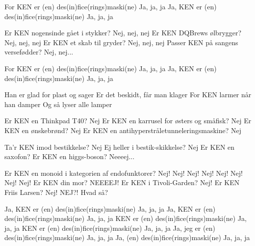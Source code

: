 \documentclass[a4paper,11pt]{article}
\begin{document}
\begin{song}
 For KEN er (en) des(in)fice(rings)maski(ne)
 Ja, ja, ja 
 Ja, KEN er (en) des(in)fice(rings)maski(ne)
 Ja, ja, ja

 Er KEN nogensinde gået i stykker?
 Nej, nej, nej
 Er KEN DQBrews ølbrygger?
 Nej, nej, nej
 Er KEN et skab til gryder?
 Nej, nej, nej
 Passer KEN på sangens versefødder?
 Nej, nej...

 For KEN er (en) des(in)fice(rings)maski(ne) 
 Ja, ja, ja 
 Ja, KEN er (en) des(in)fice(rings)maski(ne) 
 Ja, ja, ja

 Han er glad for plast og sager
Er det beskidt, får man klager
For KEN larmer når han damper
Og så lyser alle lamper



 Er KEN en Thinkpad T40?
 Nej
 Er KEN en karrusel for østers og småfisk?
 Nej
 Er KEN en ønskebrønd?
 Nej
 Er KEN en antihyperstråletunneleringsmaskine?
 Nej


 Ta'r KEN imod bestikkelse?
 Nej
 Ej heller i bestik-skikkelse?
 Nej
 Er KEN en saxofon?
 Er KEN en higgs-boson?
 Neeeej...


 Er KEN en monoid i kategorien af endofunktorer?
 Nej!
 Nej!
 Nej!
 Nej!
 Nej!
 Nej!
 Nej!
 Nej!
 Er KEN din mor?
 NEEEEJ!
 Er KEN i Tivoli-Garden?
 Nej!
 Er KEN Friis Larsen?
 Nej!
 NEJ?! Hvad så? 

 Ja, KEN er (en) des(in)fice(rings)maski(ne) 
 Ja, ja, ja 
 Ja, KEN er (en) des(in)fice(rings)maski(ne) 
 Ja, ja, ja 
 KEN er (en) des(in)fice(rings)maski(ne) 
 Ja, ja, ja 
 KEN er (en) des(in)fice(rings)maski(ne) 
 Ja, ja, ja
 Ja, jeg er (en) des(in)fice(rings)maski(ne) 
 Ja, ja, ja
 Ja, (en) des(in)fice(rings)maski(ne) 
 Ja, ja, ja

\end{song}
\end{document}

